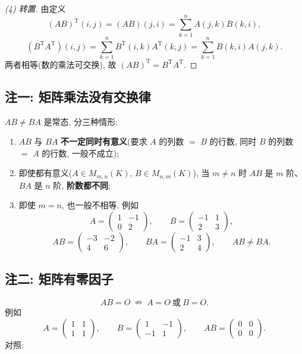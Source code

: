 \documentclass[UTF8,11pt]{ctexart}
\theoremstyle{cnthm}
\begin{document}
\begin{proof}[(4) 转置]
由定义
\[
(AB)^{\mathrm T}(i,j)=(AB)(j,i)=\sum_{k=1}^{n}A(j,k)B(k,i),
\]
\[
(B^{\mathrm T}A^{\mathrm T})(i,j)=\sum_{k=1}^{n}B^{\mathrm T}(i,k)A^{\mathrm T}(k,j)=\sum_{k=1}^{n}B(k,i)A(j,k).
\]
两者相等(数的乘法可交换), 故 $(AB)^{\mathrm T}=B^{\mathrm T}A^{\mathrm T}$.
\end{proof}

\subsection{注一: 矩阵乘法没有交换律}

$AB\neq BA$ 是常态, 分三种情形:

\begin{enumerate}
\item $AB$ 与 $BA$ \textbf{不一定同时有意义}(要求 $A$ 的列数 $=$ $B$ 的行数, 同时 $B$ 的列数 $=$ $A$ 的行数, 一般不成立);
\item 即使都有意义($A\in M_{m,n}(K)$, $B\in M_{n,m}(K)$), 当 $m\neq n$ 时 $AB$ 是 $m$ 阶、$BA$ 是 $n$ 阶, \textbf{阶数都不同};
\item 即使 $m=n$, 也一般不相等. 例如
\[
A=\begin{pmatrix}1&-1\\0&2\end{pmatrix},\qquad
B=\begin{pmatrix}-1&1\\2&3\end{pmatrix},
\]
\[
AB=\begin{pmatrix}-3&-2\\4&6\end{pmatrix},\qquad
BA=\begin{pmatrix}-1&3\\2&4\end{pmatrix},\qquad AB\neq BA .
\]
\end{enumerate}

\subsection{注二: 矩阵有零因子}

\[
AB=O\ \nRightarrow\ A=O\ \text{或}\ B=O .
\]
例如
\[
A=\begin{pmatrix}1&1\\1&1\end{pmatrix},\qquad
B=\begin{pmatrix}1&-1\\-1&1\end{pmatrix},\qquad
AB=\begin{pmatrix}0&0\\0&0\end{pmatrix}.
\]
对照:
\end{document}
